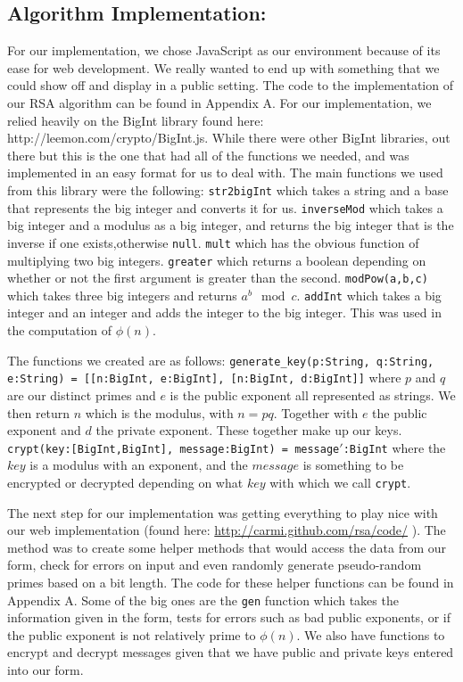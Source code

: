 \documentclass[11pt,twoside]{article}
\newcommand{\ty}[1]{\texttt{#1}}
\begin{document}
\begin{multicols}{2}
\section{Algorithm Implementation:}
For our implementation, we chose JavaScript as our environment because of its
ease for web development. We really wanted to end up with something that we
could show off and display in a public setting. The code to the implementation
of our RSA algorithm can be found in Appendix A. For our implementation, we
relied heavily on the BigInt library found here: 
http://leemon.com/crypto/BigInt.js.
While there were other BigInt libraries, out there but this is the one that had
all of the functions we needed, and was implemented in an easy format for us to
deal with. The main functions we used from this library were the following:
\ty{str2bigInt} which takes a string and a base that represents the big integer 
and converts it for us. 
\ty{inverseMod} which takes a big integer and a modulus as a big integer, and 
returns the big integer that is the inverse if one exists,otherwise \ty{null}. 
\ty{mult} which has the obvious function of multiplying two big integers.
\ty{greater} which returns a boolean depending on whether or not the first 
argument is greater than the second.
\ty{modPow(a,b,c)} which takes three big integers and returns $a^b \mod c$.  
\ty{addInt} which takes a big integer and an integer and adds the integer to 
the big integer. This was used in the computation of $\phi(n)$. 

The functions we created are as follows:
\ty{generate\_key(p:String, q:String, e:String) = [[n:BigInt, e:BigInt],
[n:BigInt, d:BigInt]]} where $p$ and $q$ are our distinct primes and $e$ is the
public exponent all represented as strings. We then return $n$ which is the
modulus, with $n = pq$. Together with $e$ the public exponent and $d$ the
private exponent. These together make up our keys.
\ty{crypt(key:[BigInt,BigInt], message:BigInt) = message$'$:BigInt} where the 
$key$ is a modulus with an exponent, and the $message$ is something to be 
encrypted or decrypted depending on what $key$ with which we call \ty{crypt}.

The next step for our implementation was getting everything to play nice with
our web implementation (found here: \url{http://carmi.github.com/rsa/code/} ). The 
method was to create some helper methods that would access the data from our 
form, check for errors on input and
even randomly generate pseudo-random primes based on a bit length. The code for
these helper functions can be found in Appendix A. Some of the big ones are the
\ty{gen} function which takes the information given in the form, tests for
errors such as bad public exponents, or if the public exponent is not relatively
prime to $\phi(n)$. We also have functions to encrypt and decrypt messages given
that we have public and private keys entered into our form.


\end{multicols}
\end{document}
